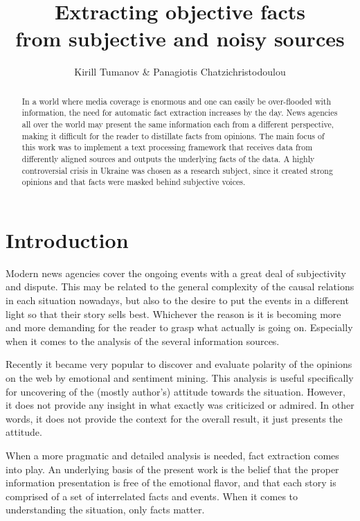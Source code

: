 \documentclass[]{article}
\title{Extracting objective facts \\ from subjective and noisy sources}
\author{Kirill Tumanov \& Panagiotis Chatzichristodoulou}
\begin{document}
\maketitle

\begin{abstract}
\noindent
In a world where media coverage is enormous and one can easily be over-flooded with information, the need for automatic fact extraction increases by the day. News agencies all over the world may present the same information each from a different perspective, making it difficult for the reader to distillate facts from opinions. The main focus of this work was to implement a text processing framework that receives data from differently aligned sources and outputs the underlying facts of the data. A highly controversial crisis in Ukraine was chosen as a research subject, since it created strong opinions and  that facts were masked behind subjective voices.
\end{abstract}

%
\section{Introduction}
%
Modern news agencies cover the ongoing events with a great deal of subjectivity and dispute. This may be related to the general complexity of the causal relations in each situation nowadays, but also to the desire to put the events in a different light so that their story sells best. Whichever the reason is it is becoming more and more demanding for the reader to grasp what actually is going on. Especially when it comes to the analysis of the several information sources.

Recently it became very popular to discover and evaluate polarity of the opinions on the web by emotional and sentiment mining. This analysis is useful specifically for uncovering of the (mostly author's) attitude towards the situation. However, it does not provide any insight in what exactly was criticized or admired. In other words, it does not provide the context for the overall result, it just presents the attitude.

When a more pragmatic and detailed analysis is needed, fact extraction comes into play. An underlying basis of the present work is the belief that the proper information presentation is free of the emotional flavor, and that each story is comprised of a set of interrelated facts and events. When it comes to understanding the situation, only facts matter.
\end{document}
